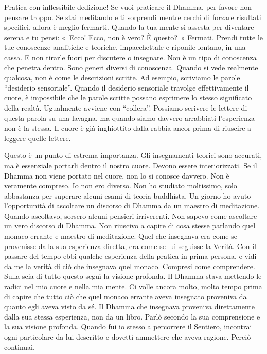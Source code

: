 Pratica con inflessibile dedizione! Se vuoi praticare il Dhamma, per
favore non pensare troppo. Se stai meditando e ti sorprendi mentre
cerchi di forzare risultati specifici, allora è meglio fermarti. Quando
la tua mente si assesta per diventare serena e tu pensi: «~Ecco! Ecco,
non è vero? È questo?~» Fermati. Prendi tutte le tue conoscenze
analitiche e teoriche, impacchettale e riponile lontano, in una cassa. E
non tirarle fuori per discutere o insegnare. Non è un tipo di conoscenza
che penetra dentro. Sono generi diversi di conoscenza. Quando si vede
realmente qualcosa, non è come le descrizioni scritte. Ad esempio,
scriviamo le parole ``desiderio sensoriale''. Quando il desiderio
sensoriale travolge effettivamente il cuore, è impossibile che le parole
scritte possano esprimere lo stesso significato della realtà. Ugualmente
avviene con ``collera''. Possiamo scrivere le lettere di questa parola
su una lavagna, ma quando siamo davvero arrabbiati l'esperienza non è la
stessa. Il cuore è già inghiottito dalla rabbia ancor prima di riuscire
a leggere quelle lettere.

Questo è un punto di estrema importanza. Gli insegnamenti teorici sono
accurati, ma è essenziale portarli dentro il nostro cuore. Devono essere
interiorizzati. Se il Dhamma non viene portato nel cuore, non lo si
conosce davvero. Non è veramente compreso. Io non ero diverso. Non ho
studiato moltissimo, solo abbastanza per superare alcuni esami di teoria
buddhista. Un giorno ho avuto l'opportunità di ascoltare un discorso di
Dhamma da un maestro di meditazione. Quando ascoltavo, sorsero alcuni
pensieri irriverenti. Non sapevo come ascoltare un vero discorso di
Dhamma. Non riuscivo a capire di cosa stesse parlando quel monaco
errante e maestro di meditazione. Quel che insegnava era come se
provenisse dalla sua esperienza diretta, era come se lui seguisse la
Verità. Con il passare del tempo ebbi qualche esperienza della pratica
in prima persona, e vidi da me la verità di ciò che insegnava quel
monaco. Compresi come comprendere. Sulla scia di tutto questo seguì la
visione profonda. Il Dhamma stava mettendo le radici nel mio cuore e
nella mia mente. Ci volle ancora molto, molto tempo prima di capire che
tutto ciò che quel monaco errante aveva insegnato proveniva da quanto
egli aveva visto da sé. Il Dhamma che insegnava proveniva direttamente
dalla sua stessa esperienza, non da un libro. Parlò secondo la sua
comprensione e la sua visione profonda. Quando fui io stesso a
percorrere il Sentiero, incontrai ogni particolare da lui descritto e
dovetti ammettere che aveva ragione. Perciò continuai.


